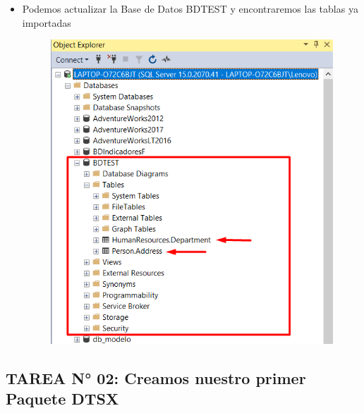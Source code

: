\documentclass{article}
\begin{document}
\begin{itemize}
\item Podemos actualizar la Base de Datos BDTEST y encontraremos las tablas ya importadas
	\begin{figure}[htb]
		\begin{center}
			\includegraphics[width=12cm]{./images/Tarea1_11}
		\end{center}
	\end{figure}

\end{itemize}

\newpage


\subsection{TAREA N° 02: Creamos nuestro primer Paquete DTSX}
\end{document}
